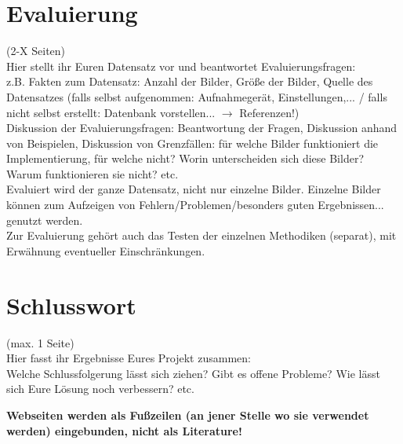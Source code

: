 \documentclass[paper=A4, deutsch]{scrartcl}
\begin{document}
\section{Evaluierung}
(2-X Seiten)\\
Hier stellt ihr Euren Datensatz vor und beantwortet Evaluierungsfragen:\\
z.B. Fakten zum Datensatz: Anzahl der Bilder, Größe der Bilder, Quelle des Datensatzes (falls selbst aufgenommen: Aufnahmegerät, Einstellungen,... / falls nicht selbst erstellt: Datenbank vorstellen... $\to$ Referenzen!)\\
Diskussion der Evaluierungsfragen: Beantwortung der Fragen, Diskussion anhand von Beispielen, Diskussion von Grenzfällen: für welche Bilder funktioniert die Implementierung, für welche nicht? Worin unterscheiden sich diese Bilder? Warum funktionieren sie nicht? etc.\\
Evaluiert wird der ganze Datensatz, nicht nur einzelne Bilder. Einzelne Bilder können zum Aufzeigen von Fehlern/Problemen/besonders guten Ergebnissen... genutzt werden.\\
Zur Evaluierung gehört auch das Testen der einzelnen Methodiken (separat), mit Erwähnung eventueller Einschränkungen.

\section{Schlusswort}
(max. 1 Seite)\\
Hier fasst ihr Ergebnisse Eures Projekt zusammen:\\
Welche Schlussfolgerung lässt sich ziehen? Gibt es offene Probleme? Wie lässt sich Eure Lösung noch verbessern? etc.




\textbf{Webseiten werden als Fußzeilen (an jener Stelle wo sie verwendet werden) eingebunden, nicht als Literature!}
\end{document}

